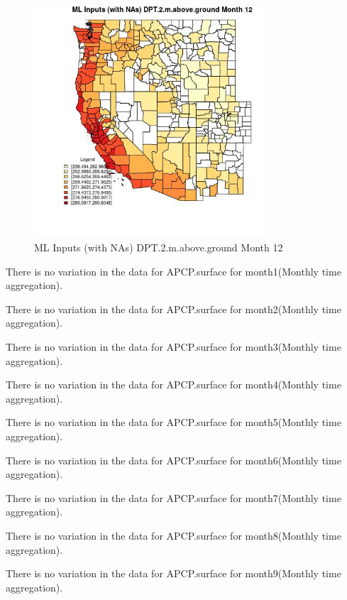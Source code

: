 \begin{figure} 
\centering  
\includegraphics[width=0.77\textwidth]{Code_Outputs/Report_ML_input_PM25_Step4_part_f_de_duplicated_aves_prioritize_24hr_obswNAs_CountyDPT2mabovegroundmedianMonth12.jpg} 
\caption{\label{fig:Report_ML_input_PM25_Step4_part_f_de_duplicated_aves_prioritize_24hr_obswNAsCountyDPT2mabovegroundmedianMonth12}ML Inputs (with NAs) DPT.2.m.above.ground Month 12} 
\end{figure} 
 

There is no variation in the data for APCP.surface for month1(Monthly time aggregation). 
 

There is no variation in the data for APCP.surface for month2(Monthly time aggregation). 
 

There is no variation in the data for APCP.surface for month3(Monthly time aggregation). 
 

There is no variation in the data for APCP.surface for month4(Monthly time aggregation). 
 

There is no variation in the data for APCP.surface for month5(Monthly time aggregation). 
 

There is no variation in the data for APCP.surface for month6(Monthly time aggregation). 
 

There is no variation in the data for APCP.surface for month7(Monthly time aggregation). 
 

There is no variation in the data for APCP.surface for month8(Monthly time aggregation). 
 

There is no variation in the data for APCP.surface for month9(Monthly time aggregation). 
 

